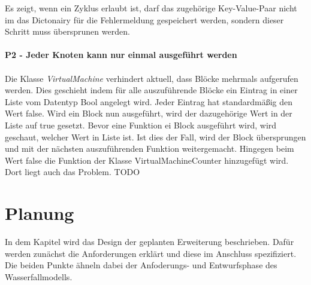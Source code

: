         Es zeigt, wenn ein Zyklus erlaubt ist, darf das zugehörige Key-Value-Paar nicht im das Dictonairy für die Fehlermeldung gespeichert werden, sondern dieser Schritt muss übersprunen werden.\\
        \\
        \textbf{P2 - Jeder Knoten kann nur einmal ausgeführt werden}\\
        \\
        Die Klasse \textit{VirtualMachine} verhindert aktuell, dass Blöcke mehrmals aufgerufen werden.
        Dies geschieht indem für alle auszuführende Blöcke ein Eintrag in einer Liste vom Datentyp Bool angelegt wird.
        Jeder Eintrag hat standardmäßig den Wert false. 
        Wird ein Block nun ausgeführt, wird der dazugehörige Wert in der Liste auf true gesetzt.
        Bevor eine Funktion ei Block ausgeführt wird, wird geschaut, welcher Wert in Liste ist.
        Ist dies der Fall, wird der Block übersprungen und mit der nächsten auszuführenden Funktion weitergemacht.
        Hingegen beim Wert false die Funktion der Klasse VirtualMachineCounter hinzugefügt wird.
        Dort liegt auch das Problem.
        TODO
    \newpage
    \chapter{Planung}
    In dem Kapitel wird das Design der geplanten Erweiterung beschrieben. 
    Dafür werden zunächst die Anforderungen erklärt und diese im Anschluss spezifiziert.
    Die beiden Punkte ähneln dabei der Anfoderungs- und Entwurfsphase des Wasserfallmodells.
